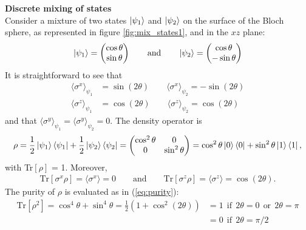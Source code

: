 \begin{tcolorbox} 
\textbf{Discrete mixing of states} \\
Consider a mixture of two states $\ket{\psi_1}$ and $\ket{\psi_2}$ on the surface of the Bloch sphere, as represented in figure \ref{fig:mix_states1}, and in the $xz$ plane:
\begin{align*}
    \ket{\psi_1} = \begin{pmatrix} \cos{\theta} \\ \sin{\theta} \end{pmatrix} \qquad \text{and} \qquad \ket{\psi_2} = \begin{pmatrix} \cos{\theta} \\ -\sin{\theta} \end{pmatrix}
\end{align*}
It is straightforward to see that 
\begin{align*}
    \langle \sigma^x \rangle_{\psi_1} &= \sin{(2 \theta)} \qquad \langle \sigma^x \rangle_{\psi_2} = -\sin{(2 \theta)} \\  
    \langle \sigma^z \rangle_{\psi_1} &= \cos{(2 \theta)} \qquad \langle \sigma^z \rangle_{\psi_2} = \cos{(2 \theta)}
\end{align*}
and that $\langle \sigma^y \rangle_{\psi_1} = \langle \sigma^y \rangle_{\psi_2} = 0$. The density operator is 
\begin{align*}
    \rho = \frac{1}{2} \ket{\psi_1}\bra{\psi_1} + \frac{1}{2} \ket{\psi_2}\bra{\psi_2} = \begin{pmatrix} \cos^2{\theta} & 0 \\ 0 & \sin^2{\theta} \end{pmatrix} = \cos^2{\theta} \ket{0}\bra{0} + \sin^2{\theta} \ket{1}\bra{1},
\end{align*}
with Tr$[\rho]$ = 1. Moreover, 
\begin{align*}
    \text{Tr}[\sigma^x \rho] = \langle \sigma^x \rangle = 0 \qquad \text{and} \qquad \text{Tr}[\sigma^z \rho] = \langle \sigma^z \rangle = \cos{(2\theta)}. 
\end{align*}
The purity of $\rho$ is evaluated as in (\ref{eq:purity}): 
\begin{align*}
    \text{Tr}[\rho^2] = \cos^4 \theta + \sin^4 \theta = \frac{1}{2} (1 + \cos^2{(2 \theta)}) &= 1 ~~\text{if}~~ 2\theta = 0 ~~\text{or}~~ 2\theta = \pi \\
    &= 0 ~~\text{if}~~ 2 \theta = \pi/2
\end{align*}
\end{tcolorbox}

